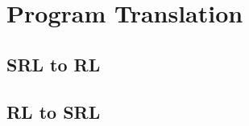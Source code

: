 \section{Program Translation}

\subsection{SRL to RL}
\noindent {}


\subsection{RL to SRL}
\noindent {}

